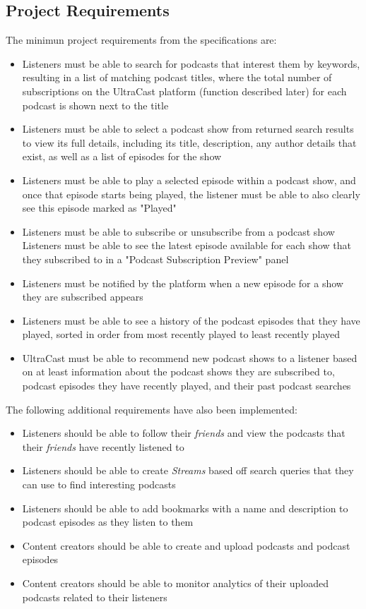 \documentclass[../report.tex]{subfiles}
\begin{document}
\subsection{Project Requirements}
The minimun project requirements from the specifications are:
\begin{itemize}
    \item Listeners must be able to search for podcasts that interest them by keywords, resulting in a list of matching podcast titles, where the total number of subscriptions on the UltraCast platform (function described later) for each podcast is shown next to the title
    \item Listeners must be able to select a podcast show from returned search results to view its full details, including its title, description, any author details that exist, as well as a list of episodes for the show 
    \item Listeners must be able to play a selected episode within a podcast show, and once that episode starts being played, the listener must be able to also clearly see this episode marked as "Played" 
    \item Listeners must be able to subscribe or unsubscribe from a podcast show         Listeners must be able to see the latest episode available for each show that they subscribed to in a "Podcast Subscription Preview" panel
    \item Listeners must be notified by the platform when a new episode for a show  they are subscribed appears
    \item Listeners must be able to see a history of the podcast episodes that they have played, sorted in order from most recently played to least recently played
    \item UltraCast must be able to recommend new podcast shows to a listener based on at least information about the podcast shows they are subscribed to, podcast episodes they have recently played, and their past podcast searches
\end{itemize}
%
The following additional requirements have also been implemented:
\begin{itemize}
    \item Listeners should be able to follow their \textit{friends} and view the podcasts that their \textit{friends} have recently listened to
    \item Listeners should be able to create \textit{Streams} based off search queries that they can use to find interesting podcasts
    \item Listeners should be able to add bookmarks with a name and description to podcast episodes as they listen to them
    \item Content creators should be able to create and upload podcasts and podcast episodes
    \item Content creators should be able to monitor analytics of their uploaded podcasts related to their listeners
\end{itemize}
\end{document}
